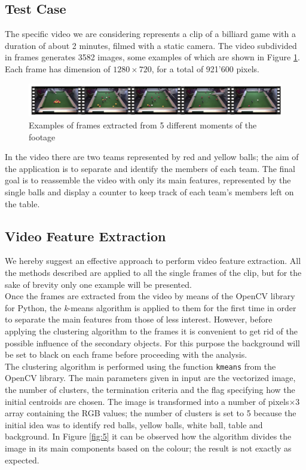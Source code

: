 \documentclass{usiinftr}
\begin{document}
\subsection{Test Case}
The specific video we are considering represents a clip of a billiard game with a duration of about 2 minutes, filmed with a static camera. The video subdivided in frames generates 3582 images, some examples of which are shown in Figure \ref{fig:4}. Each frame has dimension of $1280 \times 720$,  for a total of 921'600 pixels. \\
\begin{figure}[h]
	\centering
	\includegraphics[width=0.98\linewidth]{img/video_frames}
	\caption{Examples of frames extracted from 5 different moments of the footage}
	\label{fig:4}
\end{figure}

\noindent
In the video there are two teams represented by red and yellow balls; the aim of the application is to separate and identify the members of each team. The final goal is to reassemble the video with only its main features, represented by the single balls and display a counter to keep track of each team's members left on the table. 

\subsection{Video Feature Extraction}
We hereby suggest an effective approach to perform video feature extraction. All the methods described are applied to all the single frames of the clip, but for the sake of brevity only one example will be presented.  \\
Once the frames are extracted from the video by means of the OpenCV library for Python, the \textit{k}-means algorithm is applied to them for the first time in order to separate the main features from those of less interest. However, before applying the clustering algorithm to the frames it is convenient to get rid of the possible influence of the secondary objects. For this purpose the background will be set to black on each frame before proceeding with the analysis. \\
The clustering algorithm is performed using the function \texttt{kmeans} from the OpenCV library. The main parameters given in input are the vectorized image, the number of clusters, the termination criteria  and the flag specifying how the initial centroids are chosen. The image is transformed into a number of pixels$\times 3$ array containing the RGB values; the number of clusters is set to 5 because the initial idea was to identify red balls, yellow balls, white ball, table and background. 
In Figure \ref{fig:5} it can be observed how the algorithm divides the image in its main components based on the colour; the result is not exactly as expected. 
\end{document}
